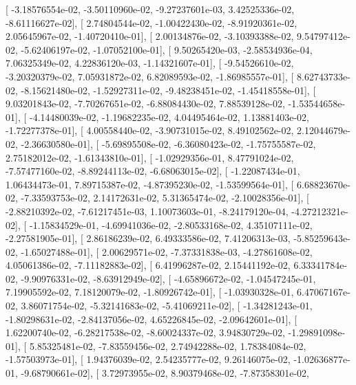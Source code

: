 \documentclass{article}
\begin{document}
       [ -3.18576554e-02,  -3.50110960e-02,  -9.27237601e-03,
          3.42525336e-02,  -8.61116627e-02],
       [  2.74804544e-02,  -1.00422430e-02,  -8.91920361e-02,
          2.05645967e-02,  -1.40720410e-01],
       [  2.00134876e-02,  -3.10393388e-02,   9.54797412e-02,
         -5.62406197e-02,  -1.07052100e-01],
       [  9.50265420e-03,  -2.58534936e-04,   7.06325349e-02,
          4.22836120e-03,  -1.14321607e-01],
       [ -9.54526610e-02,  -3.20320379e-02,   7.05931872e-02,
          6.82089593e-02,  -1.86985557e-01],
       [  8.62743733e-02,  -8.15621480e-02,  -1.52927311e-02,
         -9.48238451e-02,  -1.45418558e-01],
       [  9.03201843e-02,  -7.70267651e-02,  -6.88084430e-02,
          7.88539128e-02,  -1.53544658e-01],
       [ -4.14480039e-02,  -1.19682235e-02,   4.04495464e-02,
          1.13881403e-02,  -1.72277378e-01],
       [  4.00558440e-02,  -3.90731015e-02,   8.49102562e-02,
          2.12044679e-02,  -2.36630580e-01],
       [ -5.69895508e-02,  -6.36080423e-02,  -1.75755587e-02,
          2.75182012e-02,  -1.61343810e-01],
       [ -1.02929356e-01,   8.47791024e-02,  -7.57477160e-02,
         -8.89244113e-02,  -6.68063015e-02],
       [ -1.22087434e-01,   1.06434473e-01,   7.89715387e-02,
         -4.87395230e-02,  -1.53599564e-01],
       [  6.68823670e-02,  -7.33593753e-02,   2.14172631e-02,
          5.31365474e-02,  -2.10028356e-01],
       [ -2.88210392e-02,  -7.61217451e-03,   1.10073603e-01,
         -8.24179120e-04,  -4.27212321e-02],
       [ -1.15834529e-01,  -4.69941036e-02,  -2.80533168e-02,
          4.35107111e-02,  -2.27581905e-01],
       [  2.86186239e-02,   6.49333586e-02,   7.41206313e-03,
         -5.85259643e-02,  -1.65027488e-01],
       [  2.00629571e-02,  -7.37331838e-03,  -4.27861608e-02,
          4.05061386e-02,  -7.11182883e-02],
       [  6.41996287e-02,   2.15441192e-02,   6.33341784e-02,
         -9.90976331e-02,  -8.63912949e-02],
       [ -4.65896672e-02,  -1.04547245e-01,   7.19905592e-02,
          7.18120079e-02,  -1.80926742e-01],
       [ -1.03930328e-01,   6.47067167e-02,   3.86071754e-02,
         -5.32141683e-02,  -5.41069211e-02],
       [ -1.34281243e-01,  -1.80298631e-02,  -2.84137056e-02,
          4.65226845e-02,  -2.09642601e-01],
       [  1.62200740e-02,  -6.28217538e-02,  -8.60024337e-02,
          3.94830729e-02,  -1.29891098e-01],
       [  5.85325481e-02,  -7.83559456e-02,   2.74942288e-02,
          1.78384084e-02,  -1.57503973e-01],
       [  1.94376039e-02,   2.54235777e-02,   9.26146075e-02,
         -1.02636877e-01,  -9.68790661e-02],
       [  3.72973955e-02,   8.90379468e-02,  -7.87358301e-02,
\end{document}
